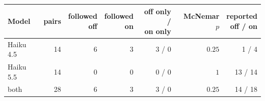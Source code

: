\begin{tabular}{@{}lrrrrrr@{}}\toprule
Model & pairs & \shortstack{followed\\off} & \shortstack{followed\\on} & \shortstack{off only /\\on only} & McNemar $p$ & \shortstack{reported\\off / on}\\\midrule
Haiku 4.5 & 14 & 6 & 3 & 3 / 0 & $0.25$ & 1 / 4\\
Haiku 5.5 & 14 & 0 & 0 & 0 / 0 & $1$ & 13 / 14\\
both & 28 & 6 & 3 & 3 / 0 & $0.25$ & 14 / 18\\
\bottomrule
\end{tabular}
